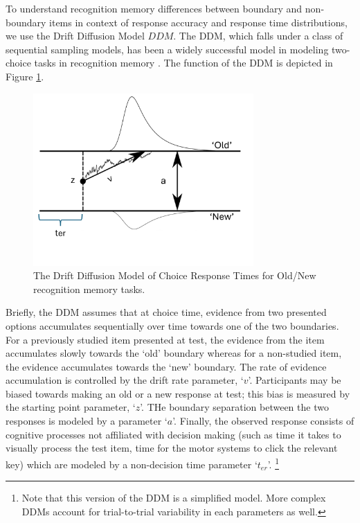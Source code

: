 To understand recognition memory differences between boundary and non-boundary items in context of response accuracy and response time distributions, we use the Drift Diffusion Model \(DDM\). The DDM, which falls under a class of sequential sampling models, has been a widely successful model in modeling two-choice tasks in recognition memory \cite{ratcliff2004diffusion, ratcliff2022discriminating, starns2014using, starns2014validating, ratcliff2009modeling}. The function of the DDM is depicted in Figure \ref{fig:ddm-model}. 

\begin{figure}[ht]
    \label{fig:ddm-model}
    \centering
    \includegraphics[width = 0.75\textwidth]{chapter_notebooks/chapter_3/figures/ddm.png}
    \caption{The Drift Diffusion Model of Choice Response Times for Old/New recognition memory tasks.}
\end{figure}

Briefly, the DDM assumes that at choice time, evidence from two presented options accumulates sequentially over time towards one of the two boundaries. For a previously studied item presented at test, the evidence from the item accumulates slowly towards the `old' boundary whereas for a non-studied item, the evidence accumulates towards the `new' boundary. The rate of evidence accumulation is controlled by the drift rate parameter, `$v$'. Participants may be biased towards making an old or a new response at test; this bias is measured by the starting point parameter, `$z$'. THe boundary separation between the two responses is modeled by a parameter `$a$'. Finally, the observed response consists of cognitive processes not affiliated with decision making (such as time it takes to visually process the test item, time for the motor systems to click the relevant key) which are modeled by a non-decision time parameter `$t_{er}$'. \footnote{Note that this version of the DDM is a simplified model. More complex DDMs account for trial-to-trial variability in each parameters as well.} 

